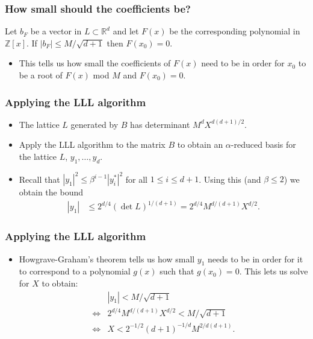 \documentclass{beamer}
\newcommand{\integers}{\mathbb{Z}}
\newcommand{\reals}{\mathbb{R}}
\begin{document}
\begin{frame}
	\frametitle{How small should the coefficients be?}
	\begin{theorem}
		Let $b_F$ be a vector in $L\subset \reals^d$ and let $F(x)$ be the corresponding polynomial in $\integers[x]$. If $|b_F| \leq M/\sqrt{d+1}$ then $F(x_0)= 0$.\pause
	\end{theorem}
	\begin{itemize}
		\item This tells us how small the coefficients of $F(x)$ need to be in order for $x_0$ to be a root of $F(x)$ mod $M$ and $F(x_0) = 0$.
	\end{itemize}
\end{frame}

\begin{frame}
	\frametitle{Applying the LLL algorithm}
	\begin{itemize}
		\item The lattice $L$ generated by $B$ has determinant $M^dX^{d(d+1)/2}$.\pause
		\item Apply the LLL algorithm to the matrix $B$ to obtain an $\alpha$-reduced basis for the lattice $L$, $y_1, \ldots, y_d$.\pause
		\item Recall that $|y_1|^2 \leq \beta^{i-1}|y_i^*|^2$ for all $1\leq i \leq d+1$. Using this (and $\beta\leq 2$) we obtain the bound
		\begin{align*}
		|y_1| &\leq 2^{d/4}(\det L)^{1/(d+1)} = 2^{d/4}M^{d/(d+1)}X^{d/2}.
		\end{align*}
	\end{itemize}
\end{frame}

\begin{frame}
	\frametitle{Applying the LLL algorithm}
	\begin{itemize}
		\item Howgrave-Graham's theorem tells us how small $y_1$ needs to be in order for it to correspond to a polynomial $g(x)$ such that $g(x_0) = 0$. This lets us solve for $X$ to obtain:
		\begin{align*}
			&|y_1| < M/\sqrt{d+1}\\
			\iff & 2^{d/4}M^{d/(d+1)}X^{d/2}< M/\sqrt{d+1}\\
			\iff &X < 2^{-1/2}(d+1)^{-1/d}M^{2/d(d+1)}.
		\end{align*}
	\end{itemize}
\end{frame}
\end{document}
